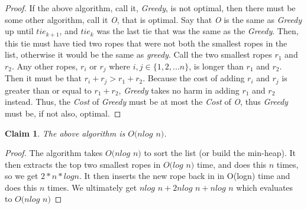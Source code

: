 \documentclass[11pt]{article}
\newtheorem{claim}[theorem]{Claim}
\begin{document}
	\begin{proof}
		If the above algorithm, call it, \textit{Greedy}, is not optimal,
		then there must be some other algorithm, call it \textit{O}, that is optimal. 
		Say that \textit{O} is the same as \textit{Greedy} up until $tie_{k+1}$, and $tie_k$ was the last tie that was the same as the \textit{Greedy}. Then, this tie must have tied two ropes that were not both the smallest ropes in the list, otherwise it would be the same as \textit{greedy}. Call the two smallest ropes $r_1$ and $r_2$. Any other ropes, $r_i$ or $r_j$ where $i, j \in \{1, 2, ... n\}$, is longer than $r_1$ and $r_2$. Then it must be that $r_i + r_j > r_1 + r_2$. Because the cost of adding $r_i$ and $r_j$ is greater than or equal to $r_1 + r_2$, \textit{Greedy} takes no harm in adding $r_1$ and $r_2$ instead. Thus, the \textit{Cost} of \textit{Greedy} must be at most the \textit{Cost} of \textit{O}, thus \textit{Greedy} must be, if not also, optimal. 
	\end{proof}

	\begin{claim} 
	The above algorithm is $O(nlog$ $n)$. 
\end{claim}

\begin{proof}
	The algorithm takes $O(nlog$ $n)$ to sort the list (or build the min-heap).
	It then extracts the top two smallest ropes in $O(log$ $n)$ time, and does this $n$ times, so we get $2*n*logn$.
	It then inserts the new rope back in in O(logn) time and does this $n$ times.
	We ultimately get $nlog$ $n + 2nlog$ $n + nlog$ $n $ which evaluates to $O(nlog$ $n)$
\end{proof}

	\newpage
	
	
\end{document}
